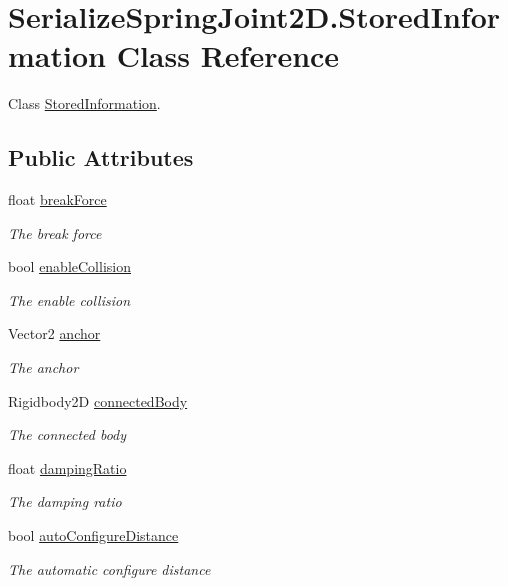 \hypertarget{class_serialize_spring_joint2_d_1_1_stored_information}{}\section{Serialize\+Spring\+Joint2\+D.\+Stored\+Information Class Reference}
\label{class_serialize_spring_joint2_d_1_1_stored_information}


Class \hyperlink{class_serialize_spring_joint2_d_1_1_stored_information}{Stored\+Information}.  


\subsection*{Public Attributes}
\begin{DoxyCompactItemize}
\item 
float \hyperlink{class_serialize_spring_joint2_d_1_1_stored_information_ac043a7db5424c46d8d42b690ded67baa}{break\+Force}
\begin{DoxyCompactList}\small\item\em The break force \end{DoxyCompactList}\item 
bool \hyperlink{class_serialize_spring_joint2_d_1_1_stored_information_af748f4709eb0c3642c2efe68f7cd79ca}{enable\+Collision}
\begin{DoxyCompactList}\small\item\em The enable collision \end{DoxyCompactList}\item 
Vector2 \hyperlink{class_serialize_spring_joint2_d_1_1_stored_information_a7b81e41d95a8772db30d8ffd5988a5f3}{anchor}
\begin{DoxyCompactList}\small\item\em The anchor \end{DoxyCompactList}\item 
Rigidbody2D \hyperlink{class_serialize_spring_joint2_d_1_1_stored_information_a900aff47b574653ec9e2b31aea89aa7c}{connected\+Body}
\begin{DoxyCompactList}\small\item\em The connected body \end{DoxyCompactList}\item 
float \hyperlink{class_serialize_spring_joint2_d_1_1_stored_information_a38654ace40cc8bd1cd31450620d1cb3a}{damping\+Ratio}
\begin{DoxyCompactList}\small\item\em The damping ratio \end{DoxyCompactList}\item 
bool \hyperlink{class_serialize_spring_joint2_d_1_1_stored_information_a026639ccba3d53fe162523af5f9d4497}{auto\+Configure\+Distance}
\begin{DoxyCompactList}\small\item\em The automatic configure distance \end{DoxyCompactList}\end{DoxyCompactItemize}


